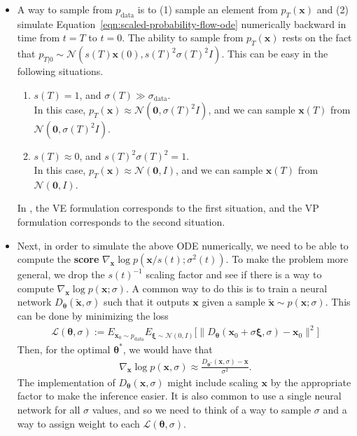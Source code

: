 \documentclass[10pt]{article}
\newcommand{\ve}[1]{\mathbf{#1}}
\newcommand{\ves}[1]{\boldsymbol{#1}}
\newcommand{\mcal}[1]{\mathcal{#1}}
\newcommand{\data}{\mathrm{data}}
\begin{document}
\begin{itemize}
  \item A way to sample from $p_{\data}$ is to (1) sample an element from $p_T(\ve{x})$ and (2) simulate Equation~\eqref{eqn:scaled-probability-flow-ode} numerically backward in time from $t = T$ to $t = 0$. The ability to sample from $p_T(\ve{x})$ rests on the fact that $p_{T|0} \sim \mcal{N}(s(T)\ve{x}(0), s(T)^2 \sigma(T)^2I)$. This can be easy in the following situations.
  \begin{enumerate}
    \item $s(T) = 1$, and $\sigma(T) \gg \sigma_{\data}$.\\ In this case, $p_T(\ve{x}) \approx \mcal{N}(\ve{0}, \sigma(T)^2I)$, and we can sample $\ve{x}(T)$ from $\mcal{N}(\ve{0}, \sigma(T)^2I)$.
    \item $s(T) \approx 0$, and $s(T)^2 \sigma(T)^2 = 1$.\\ In this case, $p_T(\ve{x}) \approx \mcal{N}(\ve{0}, I)$, and we can sample $\ve{x}(T)$ from $\mcal{N}(\ve{0}, I)$.
  \end{enumerate}
  In \cite{Song:2021}, the VE formulation corresponds to the first situation, and the VP formulation corresponds to the second situation. 
  
  \item Next, in order to simulate the above ODE numerically, we need to be able to compute the {\bf score} $\nabla_{\ve{x}} \log p(\ve{x}/s(t); \sigma^2(t))$. To make the problem more general, we drop the $s(t)^{-1}$ scaling factor and see if there is a way to compute $\nabla_{\ve{x}} \log p(\ve{x}; \sigma)$. A common way to do this is to train a neural network $D_{\ves{\theta}}(\widetilde{\ve{x}}, \sigma)$ such that it outputs $\ve{x}$ given a sample $\widetilde{\ve{x}} \sim p(\ve{x}; \sigma)$. This can be done by minimizing the loss
  \begin{align*}
    \mcal{L}(\ves{\theta}, \sigma) := E_{\ve{x}_0 \sim p_{\data}} E_{\ves{\xi} \sim \mcal{N}(0,I)} \Big[ \big\| D_{\ves{\theta}}(\ve{x}_0 + \sigma \ves{\xi}, \sigma) - \ve{x}_0 \big\|^2 \Big]
  \end{align*}
  Then, for the optimal $\ves{\theta}^*$, we would have that
  \begin{align*}
    \nabla_{\ve{x}} \log p(\ve{x}, \sigma) \approx \frac{D_{\ves{\theta}^*}(\ve{x}, \sigma) - \ve{x}}{\sigma^2}.
  \end{align*}
  The implementation of $D_{\ves{\theta}}(\ve{x}, \sigma)$ might include scaling $\ve{x}$ by the appropriate factor to make the inference easier. It is also common to use a single neural network for all $\sigma$ values, and so we need to think of a way to sample $\sigma$ and a way to assign weight to each $\mcal{L}(\ves{\theta}, \sigma)$. 
  

\end{itemize}
\end{document}
